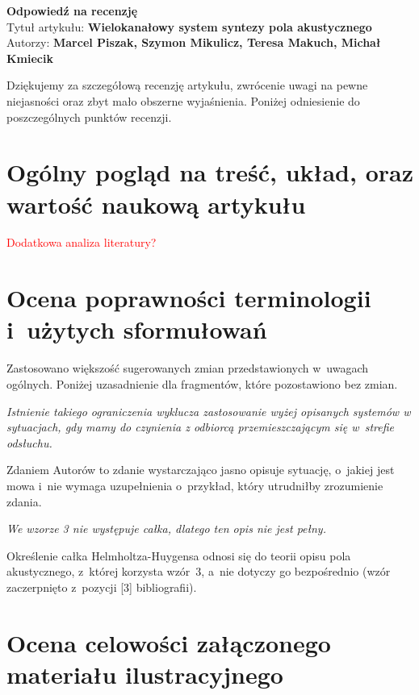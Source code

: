 \documentclass[12pt]{article}
\begin{document}
    \begin{center}
        \textbf{\large Odpowiedź na recenzję }\\
        \vspace{10pt}
        Tytuł artykułu: \textbf{Wielokanałowy system syntezy pola akustycznego} \\
        Autorzy: \textbf{Marcel Piszak, Szymon Mikulicz, Teresa Makuch, Michał Kmiecik}
    \end{center}

    Dziękujemy za szczegółową recenzję artykułu, zwrócenie uwagi na pewne
    niejasności oraz zbyt mało obszerne wyjaśnienia. Poniżej odniesienie do
    poszczególnych punktów recenzji.

    \section{Ogólny pogląd na treść, układ, oraz wartość naukową artykułu}

    \textcolor{red}{Dodatkowa analiza literatury?}

    \section{Ocena poprawności terminologii i~użytych sformułowań}

    Zastosowano większość sugerowanych zmian przedstawionych w~uwagach ogólnych. Poniżej uzasadnienie dla fragmentów, które pozostawiono bez zmian.

    \textit{Istnienie takiego ograniczenia wyklucza zastosowanie wyżej opisanych systemów w sytuacjach, gdy mamy do czynienia z odbiorcą przemieszczającym się w~strefie odsłuchu.}

    Zdaniem Autorów to zdanie wystarczająco jasno opisuje sytuację, o~jakiej jest mowa i~nie wymaga uzupełnienia o~przykład, który utrudniłby zrozumienie zdania.

    \textit{We wzorze 3 nie występuje całka, dlatego ten opis nie jest pełny.}

    Określenie całka Helmholtza-Huygensa odnosi się do teorii opisu pola akustycznego, z~której korzysta wzór~3, a~nie dotyczy go bezpośrednio (wzór zaczerpnięto z~pozycji [3] bibliografii).

    \section{Ocena celowości załączonego materiału ilustracyjnego}
\end{document}
